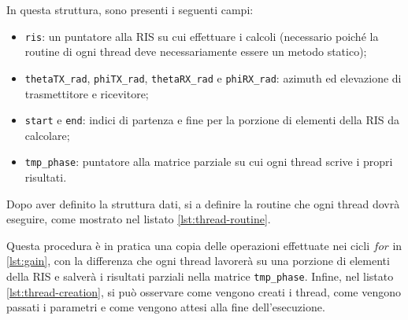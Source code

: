 \vspace{1em}

\vspace{1em}

In questa struttura, sono presenti i seguenti campi:

\begin{itemize}
  \item \texttt{ris}: un puntatore alla RIS su cui effettuare i calcoli (necessario
    poiché la routine di ogni thread deve necessariamente essere un metodo
    statico);

  \item \texttt{thetaTX\_rad}, \texttt{phiTX\_rad}, \texttt{thetaRX\_rad} e
    \texttt{phiRX\_rad}: azimuth ed elevazione di trasmettitore e ricevitore;

  \item \texttt{start} e \texttt{end}: indici di partenza e fine per la porzione
    di elementi della RIS da calcolare;

  \item \texttt{tmp\_phase}: puntatore alla matrice parziale su cui ogni thread scrive
    i propri risultati.
\end{itemize}

Dopo aver definito la struttura dati, si a definire la routine che ogni thread
dovrà eseguire, come mostrato nel listato \ref{lst:thread-routine}.

\vspace{1em}

\vspace{1em}

Questa procedura è in pratica una copia delle operazioni effettuate nei cicli
$fo r$ in \ref{lst:gain}, con la differenza che ogni thread lavorerà su una porzione
di elementi della RIS e salverà i risultati parziali nella matrice \texttt{tmp\_phase}.
Infine, nel listato \ref{lst:thread-creation}, si può osservare come vengono creati
i thread, come vengono passati i parametri e come vengono attesi alla fine dell'esecuzione.

\vspace{1em}


